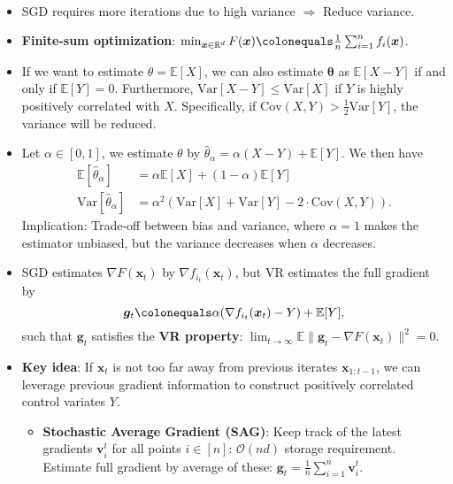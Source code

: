 \documentclass[8pt,a4paper]{extarticle}
\newcommand{\E}{\mathbb{E}}
\newcommand{\R}{\mathbb{R}}
\newcommand{\Var}{\mathrm{Var}}
\renewcommand{\vec}[1]{\bm{#1}}
\newenvironment{topic}[1]
{\textbf{\sffamily \colorbox{black}{\rlap{\textbf{\textcolor{white}{#1}}}\hspace{\linewidth}\hspace{-2\fboxsep}}} \\ \vspace{0.2cm}}
{}
\begin{document}
\begin{multicols*}{2}
    \begin{topic}{Variance reduction}
        \begin{itemize}
            \item SGD requires more iterations due to high variance $\Rightarrow$ Reduce variance.
            \item \textbf{Finite-sum optimization}: $\min_{\vec{x} \in \R^d} F(\vec{x}) \colonequals \frac{1}{n} \sum_{i=1}^{n} f_i(\vec{x})$.
            \item If we want to estimate $\theta = \E[X]$, we can also estimate $\vec{\theta}$ as $\E[X-Y]$ if and
                  only if $\E[Y] = 0$. Furthermore, $\Var[X-Y] \leq \Var[X]$ if $Y$ is highly positively correlated
                  with $X$. Specifically, if $\mathrm{Cov}(X, Y) > \frac{1}{2} \Var[Y]$, the variance will be
                  reduced.
            \item Let $\alpha \in [0,1]$, we estimate $\theta$ by $\hat{\theta}_{\alpha} = \alpha(X-Y) + \E[Y]$. We
                  then have
                  \begin{align*}
                      \E[\hat{\theta}_{\alpha}]   & = \alpha\E[X] + (1-\alpha)\E[Y]                             \\
                      \Var[\hat{\theta}_{\alpha}] & = \alpha^2 (\Var[X] + \Var[Y] - 2 \cdot \mathrm{Cov}(X,Y)).
                  \end{align*}
                  Implication: Trade-off between bias and variance, where $\alpha=1$ makes the estimator unbiased, but the variance decreases when $\alpha$ decreases.
            \item SGD estimates $\nabla F(\vec{x}_t)$ by $\nabla f_{i_t}(\vec{x}_t)$, but VR estimates the full
                  gradient by \[
                      \vec{g}_t \colonequals \alpha(\nabla f_{i_t}(\vec{x}_t) - Y) + \E[Y],
                  \]
                  such that $\vec{g}_t$ satisfies the \textbf{VR property}: $\lim_{t \to \infty} \E \| \vec{g}_t -
                      \nabla F(\vec{x}_t) \|^2 = 0$.
            \item \textbf{Key idea}: If $\vec{x}_t$ is not too far away from previous iterates
                  $\vec{x}_{1:t-1}$, we can leverage previous gradient information to construct
                  positively correlated control variates $Y$.
                  \begin{itemize}
                      \item \textbf{Stochastic Average Gradient (SAG)}: Keep track of the latest gradients $\vec{v}_i^t$ for all points $i \in [n]$: $\mathcal{O}(nd)$ storage requirement. Estimate full gradient by average of these: $\vec{g}_t = \frac{1}{n} \sum_{i=1}^{n} \vec{v}_i^t$.

\end{itemize}
\end{itemize}
\end{topic}
\end{multicols*}
\end{document}
